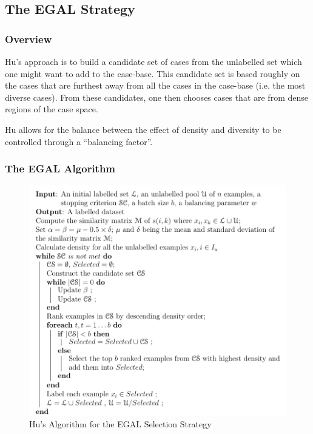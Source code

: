 \documentclass[a4paper,11pt]{report}
\begin{document}
\subsection{The EGAL Strategy}

\subsubsection{Overview}
Hu's approach is to build a candidate set of cases from the unlabelled set which one might want to add to the case-base. This candidate set is based roughly on the cases that are furthest away from all the cases in the case-base (i.e. the most diverse cases). From these candidates, one then chooses cases that are from dense regions of the case space.

Hu allows for the balance between the effect of density and diversity to be controlled through a ``balancing factor''.

\begin{samepage}

\subsubsection{The EGAL Algorithm} 

\begin{figure}[h!] \centering
\includegraphics[scale=0.75]{./Others/Hu2011EgalAlgorithm}
\caption*{Hu's Algorithm for the EGAL Selection Strategy}
\end{figure}

\end{samepage}
\end{document}
